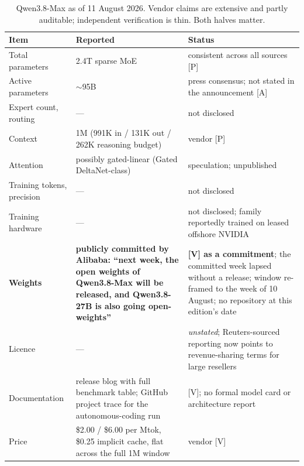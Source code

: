 \begin{table}[htbp]
  \centering
  \scriptsize
  \caption{Qwen3.8-Max as of 11 August 2026. Vendor claims are extensive and partly auditable; independent verification is thin. Both halves matter.}
  \label{tab:qwen38}
  \setlength{\tabcolsep}{4pt}
  \begin{tabular}{p{34mm}p{58mm}p{50mm}}
    \toprule
    Item & Reported & Status \\
    \midrule
    Total parameters & 2.4T sparse MoE & consistent across all sources [P] \\
    Active parameters & $\sim$95B & press consensus; not stated in the announcement [A] \\
    Expert count, routing & --- & not disclosed \\
    Context & 1M (991K in / 131K out / 262K reasoning budget) & vendor [P] \\
    Attention & possibly gated-linear (Gated DeltaNet-class) & speculation; unpublished \\
    Training tokens, precision & --- & not disclosed \\
    Training hardware & --- & not disclosed; family reportedly trained on leased offshore NVIDIA~\cite{qwen-offshore} \\
    \textbf{Weights} & \textbf{publicly committed by Alibaba: ``next week, the open weights of Qwen3.8-Max will be released, and Qwen3.8-27B is also going open-weights''} & \textbf{[V] as a commitment}; the committed week lapsed without a release; window re-framed to the week of 10 August; no repository at this edition's date~\cite{qwen-announcement,qwen-slip} \\
    Licence & --- & \emph{unstated}; Reuters-sourced reporting now points to revenue-sharing terms for large resellers~\cite{qwen-revshare} \\
    Documentation & release blog with full benchmark table; GitHub project trace for the autonomous-coding run & [V]; no formal model card or architecture report \\
    Price & \$2.00 / \$6.00 per Mtok, \$0.25 implicit cache, flat across the full 1M window & vendor [V]~\cite{qwen-announcement} \\
    \bottomrule
  \end{tabular}
\end{table}

